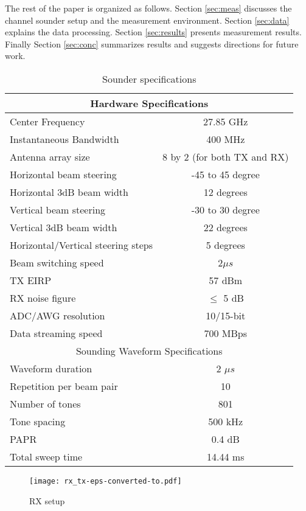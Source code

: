 \documentclass[conference]{IEEEtran}
\begin{document}
The rest of the paper is organized as follows. Section \ref{sec:meas} discusses the channel sounder setup and the measurement environment.  Section \ref{sec:data} explains the data processing. Section \ref{sec:results}  presents measurement results. Finally Section \ref{sec:conc} summarizes results and suggests directions for future work.

  \begin{table}[tbp]\centering
  \caption{Sounder specifications}
  \renewcommand{\arraystretch}{1.1}
\begin{tabular}{l|c}
    \hline
    \multicolumn{2}{c}{Hardware Specifications} \\ \hline \hline
    Center Frequency & 27.85 GHz\\
    Instantaneous Bandwidth & 400 MHz\\
    Antenna array size & 8 by 2 (for both TX and RX) \\
    Horizontal beam steering & -45 to 45 degree \\
    Horizontal 3dB beam width & 12 degrees\\
    Vertical beam steering & -30 to 30 degree \\
    Vertical 3dB beam width & 22 degrees\\
    Horizontal/Vertical steering steps & 5 degrees\\
    Beam switching speed & 2$\mu s$ \\
    TX EIRP & 57 dBm \\
    RX noise figure & $\le$ 5 dB \\ 
    ADC/AWG resolution & 10/15-bit \\
    Data streaming speed & 700 MBps \\ \hline
    \multicolumn{2}{c}{Sounding Waveform Specifications} \\ \hline \hline
    Waveform duration & 2 $\mu s$ \\
    Repetition per beam pair & 10 \\
    Number of tones & 801 \\
    Tone spacing & 500 kHz \\
    PAPR & 0.4 dB \\ 
    Total sweep time & 14.44 ms\\ \hline      
  \end{tabular} \label{specs}
\end{table}

\begin{figure}[tbp]\centering
  \texttt{[image: rx\_tx-eps-converted-to.pdf]}\caption{RX setup}\label{Fig:rx_tx.JPG}
\end{figure}
\end{document}
